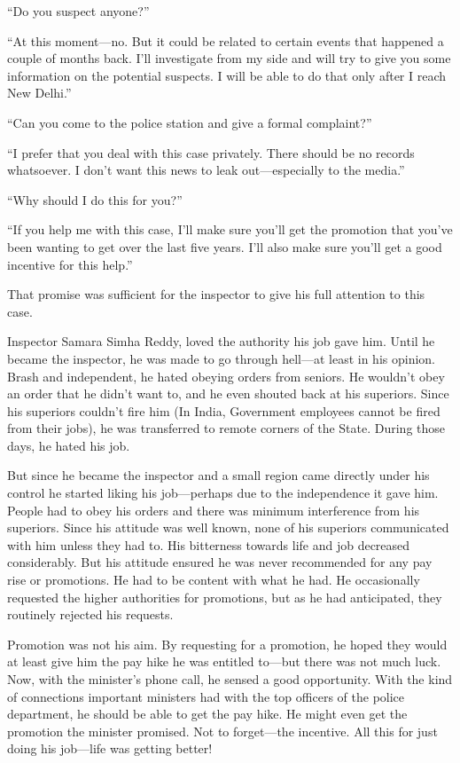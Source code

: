 “Do you suspect anyone?”

“At this moment—no. But it could be related to certain events that happened a
couple of months back. I'll investigate from my side and will try to give you
some information on the potential suspects. I will be able to do that only after
I reach New Delhi.”

“Can you come to the police station and give a formal complaint?”

“I prefer that you deal with this case privately. There should be no records
whatsoever. I don't want this news to leak out—especially to the media.”

“Why should I do this for you?”

“If you help me with this case, I'll make sure you'll get the promotion that
you've been wanting to get over the last five years. I'll also make sure you'll
get a good incentive for this help.”

That promise was sufficient for the inspector to give his full attention to this
case.

Inspector Samara Simha Reddy, loved the authority his job gave him. Until
he became the inspector, he was made to go through hell—at least in his
opinion. Brash and independent, he hated obeying orders from seniors. He
wouldn't obey an order that he didn't want to, and he even shouted back at his
superiors. Since his superiors couldn't fire him (In India, Government employees
cannot be fired from their jobs), he was transferred to remote corners of the
State. During those days, he hated his job.

But since he became the inspector and a small region came directly under his
control he started liking his job—perhaps due to the independence it gave him.
People had to obey his orders and there was minimum interference from his
superiors. Since his attitude was well known, none of his superiors communicated
with him unless they had to. His bitterness towards life and job decreased
considerably. But his attitude ensured he was never recommended for any pay rise
or promotions. He had to be content with what he had. He occasionally requested
the higher authorities for promotions, but as he had anticipated, they routinely
rejected his requests.

Promotion was not his aim. By requesting for a promotion, he hoped they would at
least give him the pay hike he was entitled to—but there was not much luck.
Now, with the minister's phone call, he sensed a good opportunity. With the kind
of connections important ministers had with the top officers of the police
department, he should be able to get the pay hike. He might even get the
promotion the minister promised. Not to forget—the incentive. All this for
just doing his job—life was getting better!